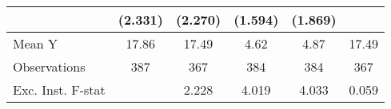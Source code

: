 {\begin{tabular}{l*{5}{c}}
            &     (2.331)         &     (2.270)         &     (1.594)         &     (1.869)         &                     \\
\midrule
Mean Y      &       17.86         &       17.49         &        4.62         &        4.87         &       17.49         \\
Observations&         387         &         367         &         384         &         384         &         367         \\
Exc. Inst. F-stat&                     &       2.228         &       4.019         &       4.033         &       0.059         \\
\bottomrule
\end{tabular}
}
